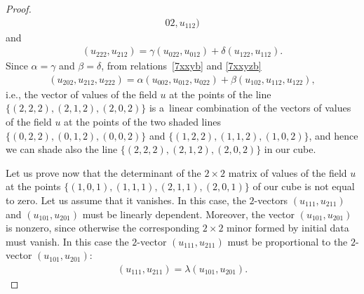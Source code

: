 \documentclass[pdftex]{sigma}
\begin{document}
\begin{proof}
\begin{gather}
{0 2}, u_{1 1 2}) \label{7xxyb} \end{gather} and
\begin{gather} (u_{2 2 2}, u_{2 1 2}) =
\gamma (u_{0 2 2}, u_{0 1 2}) + \delta (u_{1 2 2}, u_{1 1 2}).
\label{7xxyzb}
\end{gather}
Since $\alpha = \gamma$ and $\beta = \delta$,
from relations~\eqref{7xxyb} and \eqref{7xxyzb}
\begin{gather*} (u_{2 0 2}, u_{2
1 2}, u_{2 2 2}) = \alpha (u_{0 0 2}, u_{0 1 2}, u_{0 2 2}) + \beta
(u_{1 0 2}, u_{1 1 2}, u_{1 2 2}), %
\end{gather*} i.e., the
vector of values of the f\/ield $u$ at the points of the line $\{(2,
2, 2), (2, 1, 2), (2, 0, 2)\}$ is a~linear combination of the
vectors of values of the f\/ield $u$ at the points of the two shaded
lines $\{(0, 2, 2), (0, 1, 2), (0, 0, 2)\}$ and $\{(1, 2, 2), (1, 1,
2), (1, 0, 2)\}$, and hence we can shade also the line $\{(2, 2, 2),
(2, 1, 2), (2, 0, 2)\}$ in our cube.


Let us prove now that the determinant of the $2 \times 2$ matrix of
values of the f\/ield $u$ at the points $\{(1, 0, 1), (1, 1, 1), (2,
1, 1), (2, 0, 1)\}$ of our cube is not equal to zero. Let us assume
that it vanishes. In this case, the $2$-vectors $(u_{1 1 1}, u_{2 1
1})$ and $(u_{1 0 1}, u_{2 0 1})$ must be linearly dependent.
Moreover, the vector $(u_{1 0 1}, u_{2 0 1})$ is nonzero, since
otherwise the corresponding $2 \times 2$ minor formed by initial
data must vanish. In this case the $2$-vector $(u_{1 1 1}, u_{2 1
1})$ must be proportional to the $2$-vector $(u_{1 0 1}, u_{2 0
1})$: \begin{gather} (u_{1 1 1}, u_{2 1 1}) = \lambda (u_{1 0 1}, u_{2 0 1}).
\label{6xxb} \end{gather}



\end{proof}
\end{document}
